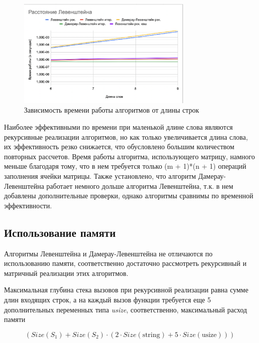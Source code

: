 \documentclass[14pt,russian]{scrartcl}
\begin{document}
	
	\begin{figure}[ht]
		\centering
		\includegraphics[width=0.75\textwidth]{plot.png}
		\caption{Зависимость времени работы алгоритмов от длины строк}
		\label{fig:plot}
	\end{figure}

	Наиболее эффективными по времени при маленькой длине слова являются рекурсивные реализации алгоритмов, но как только увеличивается длина слова, их эффективность резко снижается, что обусловлено большим количеством повторных рассчетов. Время работы алгоритма, использующего матрицу, намного меньше благодаря тому, что в нем требуется только (m + 1)*(n + 1) операций заполнения ячейки матрицы. Также установлено, что алгоритм Дамерау-Левенштейна работает немного дольше алгоритма Левенштейна, т.к. в нем добавлены дополнительные проверки, однако алгоритмы сравнимы по временной эффективности.

	\subsection{Использование памяти}

	\par
	Алгоритмы Левенштейна и Дамерау-Левенштейна не отличаются по использованию памяти, соответственно достаточно рассмотреть рекурсивный и матричный реализации этих алгоритмов.

	\par
	Максимальная глубина стека вызовов при рекурсивной реализации равна сумме длин входящих строк, а на каждый вызов функции требуется еще 5 дополнительных переменных типа \textit{usize}, соответственно, максимальный расход памяти

	\begin{equation}
		(Size(S_{1}) + Size(S_{2}) \cdot (2 \cdot Size(\text{string}) + 5 \cdot Size(\text{usize})))
	\end{equation}
	
\end{document}
